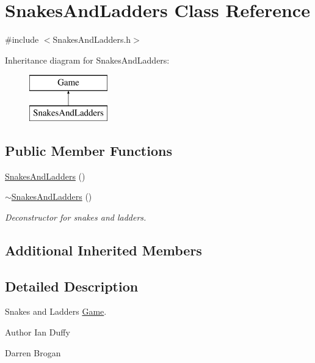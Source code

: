 \hypertarget{classSnakesAndLadders}{\section{Snakes\-And\-Ladders Class Reference}
\label{classSnakesAndLadders}
}


{\ttfamily \#include $<$Snakes\-And\-Ladders.\-h$>$}

Inheritance diagram for Snakes\-And\-Ladders\-:\begin{figure}[H]
\begin{center}
\leavevmode
\includegraphics[height=2.000000cm]{classSnakesAndLadders}
\end{center}
\end{figure}
\subsection*{Public Member Functions}
\begin{DoxyCompactItemize}
\item 
\hyperlink{classSnakesAndLadders_ae5de1882a4d4efb8dc62e5a21826f3b6}{Snakes\-And\-Ladders} ()
\item 
\hyperlink{classSnakesAndLadders_a636efaaa9c5ecca3bd580eff1e4e6d5e}{$\sim$\-Snakes\-And\-Ladders} ()
\begin{DoxyCompactList}\small\item\em Deconstructor for snakes and ladders. \end{DoxyCompactList}\end{DoxyCompactItemize}
\subsection*{Additional Inherited Members}


\subsection{Detailed Description}
Snakes and Ladders \hyperlink{classGame}{Game}. \begin{DoxyAuthor}{Author}
Ian Duffy 

Darren Brogan 
\end{DoxyAuthor}


